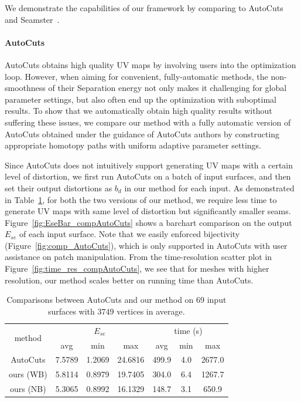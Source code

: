 We demonstrate the capabilities of our framework by comparing to AutoCuts~\cite{Poranne2017Autocuts} and Seamster~\cite{Sheffer2002Seamster}.

\paragraph{AutoCuts}
AutoCuts obtains high quality UV maps by involving users into the optimization loop. However, when aiming for convenient, fully-automatic methods, the non-smoothness of their Separation energy not only makes it challenging for global parameter settings, but also often end up the optimization with suboptimal results. To show that we automatically obtain high quality results without suffering these issues, we compare our method with a fully automatic version of AutoCuts obtained under the guidance of AutoCuts authors by constructing appropriate homotopy paths with uniform adaptive parameter settings.

Since AutoCuts does not intuitively support generating UV maps with a certain level of distortion, we first run AutoCuts on a batch of input surfaces, and then set their output distortions as $b_d$ in our method for each input. As demonstrated in Table~\ref{tb:comp_AutoCuts}, for both the two versions of our method, we require less time to generate UV maps with same level of distortion but significantly smaller seams. Figure~\ref{fig:EseBar_compAutoCuts} shows a barchart comparison on the output $E_{se}$ of each input surface. Note that we easily enforced bijectivity (Figure~\ref{fig:comp_AutoCuts}), which is only supported in AutoCuts with user assistance on patch manipulation. From the time-resolution scatter plot in Figure~\ref{fig:time_res_compAutoCuts}, we see that for meshes with higher resolution, our method scales better on running time than AutoCuts.

\begin{table}[!h]
\centering
\caption{Comparisons between AutoCuts and our method on 69 input surfaces with $3749$ vertices in average.}
\label{tb:comp_AutoCuts}
\begin{tabular}{|c|ccc|ccc|}
\hline
\multirow{2}{*}{method} & \multicolumn{3}{c|}{$E_{se}$} & \multicolumn{3}{c|}{time (s)} \\ \cline{2-7} 
                        & avg      & min     & max      & avg      & min    & max       \\ \hline
AutoCuts                & 7.5789   & 1.2069  & 24.6816  & 499.9    & 4.0    & 2677.0    \\
ours (WB)               & 5.8114   & 0.8979  & 19.7405  & 304.0    & 6.4    & 1267.7     \\
ours (NB)               & 5.3065   & 0.8992  & 16.1329  & 148.7    & 3.1    & 650.9    \\ \hline
\end{tabular}
\end{table}

